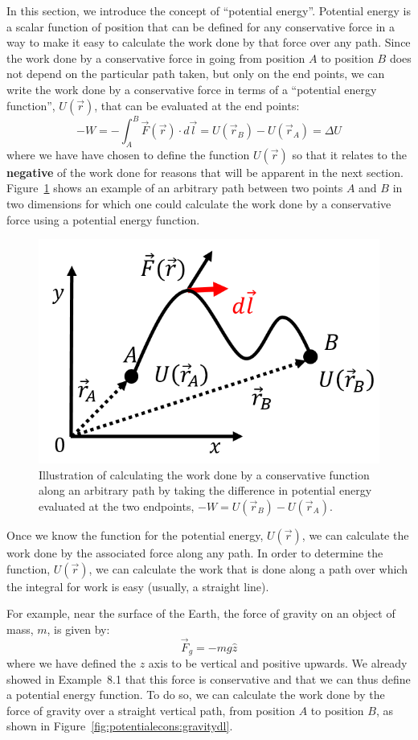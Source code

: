 In this section, we introduce the concept of ``potential energy''. Potential energy is a scalar function of position that can be defined for any conservative force in a way to make it easy to calculate the work done by that force over any path. Since the work done by a conservative force in going from position $A$ to position $B$ does not depend on the particular path taken, but only on the end points, we can write the work done by a conservative force in terms of a ``potential energy function'', $U(\vec r)$, that can be evaluated at the end points:
\begin{equation}
\boxed{-W = - \int_A^B \vec F(\vec r) \cdot d\vec l = U(\vec r_B) - U(\vec r_A) = \Delta U}
\end{equation}
where we have have chosen to define the function $U(\vec r)$ so that it relates to the \textbf{negative} of the work done for reasons that will be apparent in the next section. Figure~\ref{fig:potentialecons:potentialpath} shows an example of an arbitrary path between two points $A$ and $B$ in two dimensions for which one could calculate the work done by a conservative force using a potential energy function.

\begin{figure}[!htbp]
\centering
\includegraphics[width=0.4\linewidth]{files/potentialpath-a6e90e6b49e93ae93bfdae02b8783087.png}
\caption[]{Illustration of calculating the work done by a conservative function along an arbitrary path by taking the difference in potential energy evaluated at the two endpoints, $-W=U(\vec r_B) - U(\vec r_A)$.}
\label{fig:potentialecons:potentialpath}
\end{figure}

Once we know the function for the potential energy, $U(\vec r)$, we can calculate the work done by the associated force along any path. In order to determine the function, $U(\vec r)$, we can calculate the work that is done along a path over which the integral for work is easy (usually, a straight line).

For example, near the surface of the Earth, the force of gravity on an object of mass, $m$, is given by:
\begin{equation}
\vec F_g = -mg \hat z
\end{equation}
where we have defined the $z$ axis to be vertical and positive upwards. We already showed in Example~8.1 that this force is conservative and that we can thus define a potential energy function. To do so, we can calculate the work done by the force of gravity over a straight vertical path, from position $A$ to position $B$, as shown in Figure~\ref{fig:potentialecons:gravitydl}.

